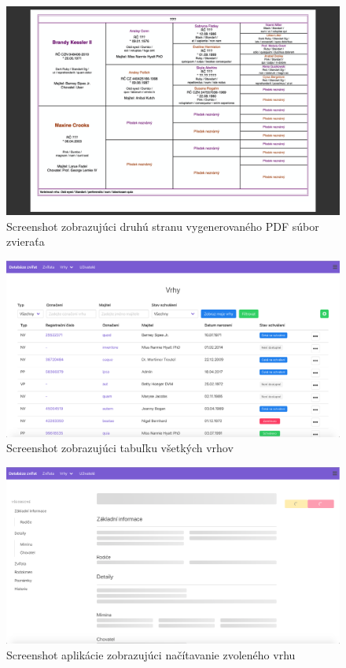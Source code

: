 \vspace*{\fill}

\begin{figure}[H]
	\includegraphics[width=1.0\textwidth]{media/priloha/vseobecne/pdf/2.png}
	\caption{Screenshot zobrazujúci druhú stranu vygenerovaného PDF súbor zvieraťa}
\end{figure}

\begin{figure}[H]
	\includegraphics[width=1.0\textwidth]{media/priloha/vrhy/1.png}
	\caption{Screenshot zobrazujúci tabuľku všetkých vrhov}
\end{figure}

\vspace*{\fill}

\begin{figure}[H]
	\includegraphics[width=1.0\textwidth]{media/priloha/vrh/1.png}
	\caption{Screenshot aplikácie zobrazujúci načítavanie zvoleného vrhu}
\end{figure}

